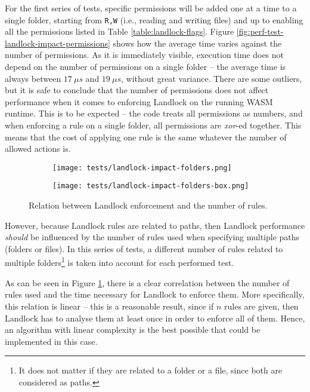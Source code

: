 For the first series of tests, specific permissions will be added one at a time to a single folder,
starting from \texttt{R,W} (i.e., reading and writing files) and up to enabling all the permissions listed
in Table \ref{table:landlock-flags}.
Figure \ref{fig:perf-test-landlock-impact-permissions} shows how the average time varies against the number of permissions.
As it is immediately visible, execution time does not depend on the number of permissions on a single folder --
the average time is always between $17\ \mu s$ and $19\ \mu s$, without great variance.
There are some outliers, but it is safe to conclude that the number of permissions does not affect performance
when it comes to enforcing Landlock on the running WASM runtime.
This is to be expected -- the code treats all permissions as numbers,
and when enforcing a rule on a single folder, all permissions are \textit{xor}-ed together.
This means that the cost of applying one rule is the same whatever the number of allowed actions is.

\begin{figure}[hbt!]
  \centering
  \begin{subfigure}[b]{0.49\textwidth}
    \texttt{[image: tests/landlock-impact-folders.png]}
  \end{subfigure}
  \begin{subfigure}[b]{0.49\textwidth}
    \texttt{[image: tests/landlock-impact-folders-box.png]}
  \end{subfigure}

  \caption{Relation between Landlock enforcement and the number of rules.}
  \label{fig:perf-test-landlock-impact-folders}
\end{figure}

However, because Landlock rules are related to paths, then Landlock performance \textit{should} be influenced by the
number of rules used when specifying multiple paths (folders or files).
In this series of tests, a different number of rules related to multiple folders\footnote{It does not matter if they are
related to a folder or a file, since both are considered as paths.} is taken into account for each performed test.

As can be seen in Figure \ref{fig:perf-test-landlock-impact-folders}, there is a clear correlation
between the number of rules used and the time necessary for Landlock to enforce them.
More specifically, this relation is linear -- this is a reasonable result, since if $n$ rules are given,
then Landlock has to analyse them at least once in order to enforce all of them.
Hence, an algorithm with linear complexity is the best possible that could be implemented
in this case.


